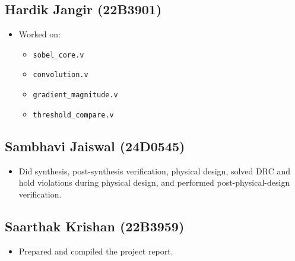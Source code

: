 \documentclass[a4paper,12pt]{article}
\begin{document}
\subsection*{Hardik Jangir (22B3901)}
\begin{itemize}
	\item Worked on:
	      \begin{itemize}
		      \item \texttt{sobel\_core.v}
		      \item \texttt{convolution.v}
		      \item \texttt{gradient\_magnitude.v}
		      \item \texttt{threshold\_compare.v}
	      \end{itemize}
\end{itemize}

\subsection*{Sambhavi Jaiswal (24D0545)}
\begin{itemize}
	\item Did synthesis, post-synthesis verification, physical design, solved DRC
	      and hold violations during physical design, and performed
	      post-physical-design verification.
\end{itemize}

\subsection*{Saarthak Krishan (22B3959)}
\begin{itemize}
	\item Prepared and compiled the project report.
\end{itemize}
\end{document}
